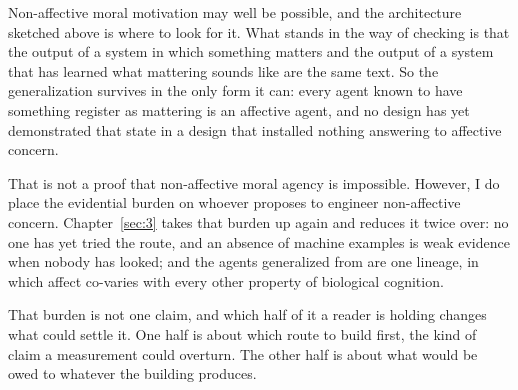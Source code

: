 Non-affective moral motivation may well be possible, and the architecture sketched above is where to look for it. What stands in the way of checking is that the output of a system in which something matters and the output of a system that has learned what mattering sounds like are the same text. So the generalization survives in the only form it can: every agent known to have something register as mattering is an affective agent, and no design has yet demonstrated that state in a design that installed nothing answering to affective concern.

That is not a proof that non-affective moral agency is impossible. However, I do place the evidential burden on whoever proposes to engineer non-affective concern. Chapter~\ref{sec:3} takes that burden up again and reduces it twice over: no one has yet tried the route, and an absence of machine examples is weak evidence when nobody has looked; and the agents generalized from are one lineage, in which affect co-varies with every other property of biological cognition.

That burden is not one claim, and which half of it a reader is holding changes what could settle it. One half is about which route to build first, the kind of claim a measurement could overturn. The other half is about what would be owed to whatever the building produces.
